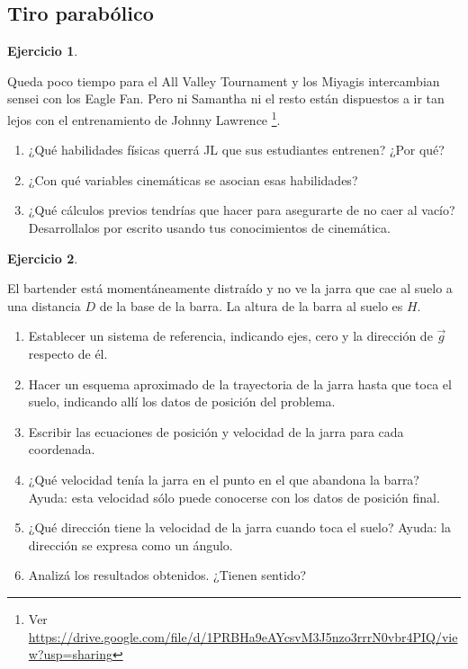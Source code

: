 \documentclass[a4paper,12pt,twoside]{book}
\newtheorem{ejercicio}{{Ejercicio}}[chapter]
\begin{document}
\subsection{Tiro parabólico}

\begin{mdframed}[style=ejercicio-conceptual]
    \begin{ejercicio}
    \end{ejercicio}
    Queda poco tiempo para el All Valley Tournament y los Miyagis intercambian sensei con los Eagle Fan. Pero ni Samantha ni el resto están dispuestos a ir tan lejos con el entrenamiento de Johnny Lawrence
    \footnote{Ver \url{https://drive.google.com/file/d/1PRBHa9eAYcsvM3J5nzo3rrrN0vbr4PIQ/view?usp=sharing}}.
    \begin{enumerate}
        \item ¿Qué habilidades físicas querrá JL que sus estudiantes entrenen? ¿Por qué?
        \item ¿Con qué variables cinemáticas se asocian esas habilidades?
        \item ¿Qué cálculos previos tendrías que hacer para asegurarte de no caer al vacío? Desarrollalos por escrito usando tus conocimientos de cinemática.
    \end{enumerate}
\end{mdframed}

\begin{mdframed}[style=ejercicio-conceptual]
    \begin{ejercicio}
    \end{ejercicio}
    El bartender está momentáneamente distraído y no ve la jarra que cae al suelo a una distancia $D$ de la base de la barra. La altura de la barra al suelo es $H$.
    \begin{enumerate}
        \item Establecer un sistema de referencia, indicando ejes, cero y la dirección de $\Vec{g}$ respecto de él. 
        \item Hacer un esquema aproximado de la trayectoria de la jarra hasta que toca el suelo, indicando allí los datos de posición del problema.
        \item Escribir las ecuaciones de posición y velocidad de la jarra para cada coordenada.
        \item ¿Qué velocidad tenía la jarra en el punto en el que abandona la barra?
        Ayuda: esta velocidad sólo puede conocerse con los datos de posición final.
        \item ¿Qué dirección tiene la velocidad de la jarra cuando toca el suelo?
        Ayuda: la dirección se expresa como un ángulo.
        \item Analizá los resultados obtenidos. ¿Tienen sentido?
    \end{enumerate}
\end{mdframed}
\end{document}
